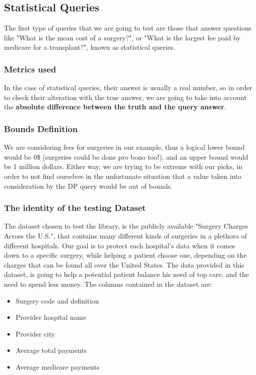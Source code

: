 \subsection{Statistical Queries}

The first type of queries that we are going to test are those that answer questions like "What is the mean cost of a surgery?", or "What is the largest fee paid by medicare for a transplant?", known as statistical queries. 

\subsubsection{Metrics used}

In the case of statistical queries, their answer is usually a real number, so in order to check their alteration with the true answer, we are going to take into account the \textbf{absolute difference between the truth and the query answer}. 

\subsubsection{Bounds Definition}

We are considering fees for surgeries in our example, thus a logical lower bound would be 0\$ (surgeries could be done pro bono too!), and an upper bound would be 1 million dollars. Either way, we are trying to be extreme with our picks, in order to not find ourselves in the unfortunate situation that a value taken into consideration by the DP query would be out of bounds.

\subsubsection{The identity of the testing Dataset}

The dataset chosen to test the library, is the publicly available "Surgery Charges Across the U.S.", that contains many different kinds of surgeries in a plethora of different hospitals. Our goal is to protect each hospital's data when it comes down to a specific surgery, while helping a patient choose one, depending on the charges that can be found all over the United States. The data provided in this dataset, is going to help a potential patient balance his need of top care, and the need to spend less money. The columns contained in the dataset are:

\begin{itemize}
    \item Surgery code and definition
    \item Provider hospital name
    \item Provider city
    \item Average total payments
    \item Average medicare payments
\end{itemize}

